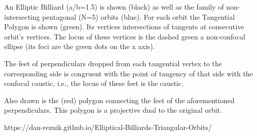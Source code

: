 An Elliptic Billiard (a/b=1.5) is shown (black) as well as the family of non-intersecting pentagonal (N=5) orbits (blue). For each orbit the Tangential Polygon is shown (green). Its vertices intersections of tangents at consecutive orbit's vertices. The locus of these vertices is the dashed green a non-confocal ellipse (its foci are the green dots on the x axis). 

The feet of perpendiculars dropped from each tangential vertex to the corresponding side is congruent with the point of tangency of that side with the confocal caustic, i.e., the locus of these feet is the caustic.

Also drawn is the (red) polygon connecting the feet of the aforementioned perpendiculars. This polygon is a projective dual to the original orbit.

https://dan-reznik.github.io/Elliptical-Billiards-Triangular-Orbits/